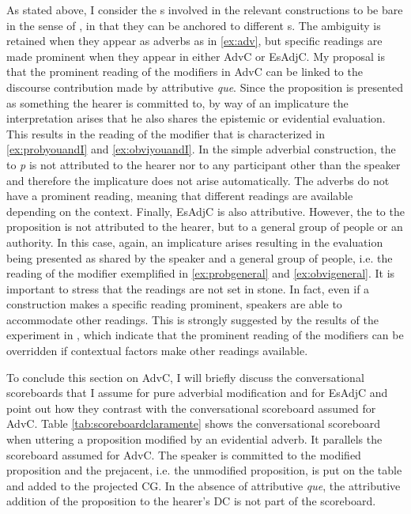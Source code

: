 As stated above, I consider  the s involved in the relevant constructions to be bare in the sense of \citet{Fintel2011}, in that they can be anchored to different s. The ambiguity is retained when they appear as adverbs as in \eqref{ex:adv}, but specific readings are made prominent when they appear in either AdvC or EsAdjC.    My proposal is that the prominent reading of the modifiers in AdvC can be linked to the discourse contribution made by attributive \emph{que}. Since the proposition is presented as something the hearer is committed to,  by way of an implicature the interpretation arises that he also shares the epistemic or evidential evaluation. This results in the reading of the modifier that is characterized in \eqref{ex:probyouandI} and \eqref{ex:obviyouandI}.
 In the simple adverbial construction, the  to \emph{p}  is not attributed to the hearer nor to any participant other than the speaker and  therefore the  implicature does not arise automatically. The adverbs do not have a prominent reading, meaning that different readings are available depending on the context.
  Finally, EsAdjC is also attributive. However, the  to the proposition is not attributed to the hearer, but to a general group of people or an authority. In this case, again, an implicature arises  resulting in  the evaluation being presented as shared by the speaker and a general group of people, i.e. the reading of the modifier exemplified in \eqref{ex:probgeneral} and \eqref{ex:obvigeneral}. It is important to stress that the readings are not set in stone. In fact, even if a construction makes a specific reading  prominent, speakers are able to accommodate other readings. This is strongly suggested by the results of the experiment in , which indicate that the prominent reading of the modifiers can be overridden if contextual factors make other readings available. 
 
 
 
To conclude this section on AdvC, I will briefly discuss the  conversational scoreboards that I assume for pure adverbial modification and for EsAdjC and point out how they contrast with the conversational scoreboard assumed for AdvC.
 Table \ref{tab:scoreboardclaramente} shows the conversational scoreboard  when uttering a proposition modified by an evidential adverb. It parallels the scoreboard assumed for AdvC. The speaker is committed to the modified proposition and the prejacent, i.e. the unmodified proposition, is put on the table and added to the projected CG. In the absence of attributive \emph{que},  the attributive addition of the proposition to the hearer's DC is not part of the scoreboard. 


